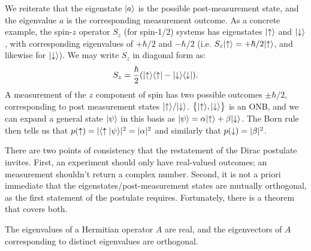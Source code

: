 We reiterate that the eigenstate $\lvert a \rangle$ is the possible post-measurement state, and the eigenvalue $a$ is the corresponding measurement outcome. As a concrete example, the spin-$z$ operator $S_z$ (for spin-1/2) systems has eigenstates $\lvert \uparrow \rangle$ and $\lvert \downarrow \rangle$, with corresponding eigenvalues of $+\hbar/2$ and $-\hbar/2$ (i.e. $S_z\lvert \uparrow \rangle = +\hbar/2\lvert \uparrow \rangle$, and likewise for $\lvert \downarrow \rangle$). We may write $S_z$ in diagonal form as:
\begin{equation}
    S_z = \frac{\hbar}{2}(\lvert \uparrow \rangle \langle \uparrow \rvert - \lvert \downarrow \rangle \langle \downarrow \rvert).
\end{equation}
A measurement of the $z$ component of spin has two possible outcomes $\pm \hbar/2$, corresponding to post measurement states $\lvert \uparrow \rangle/\lvert \downarrow \rangle$. $\set{\lvert \uparrow \rangle, \lvert \downarrow \rangle}$ is an ONB, and we can expand a general state $\lvert \psi \rangle$ in this basis as $\lvert \psi \rangle = \alpha\lvert \uparrow \rangle + \beta\lvert \downarrow \rangle$. The Born rule then tells us that $p(\uparrow) = \lvert \langle \uparrow \lvert \psi \rangle \rvert^2 = \lvert \alpha \rvert^2$ and similarly that $p(\downarrow) = \lvert \beta \rvert^2$. 

There are two points of consistency that the restatement of the Dirac postulate invites. First, an experiment should only have real-valued outcomes; an measurement shouldn't return a complex number. Second, it is not a priori immediate that the eigenstates/post-measurement states are mutually orthogonal, as the first statement of the postulate requires. Fortunately, there is a theorem that covers both.

\begin{thmbox}{}
    The eigenvalues of a Hermitian operator $A$ are real, and the eigenvectors of $A$ corresponding to distinct eigenvalues are orthogonal.
\end{thmbox}

